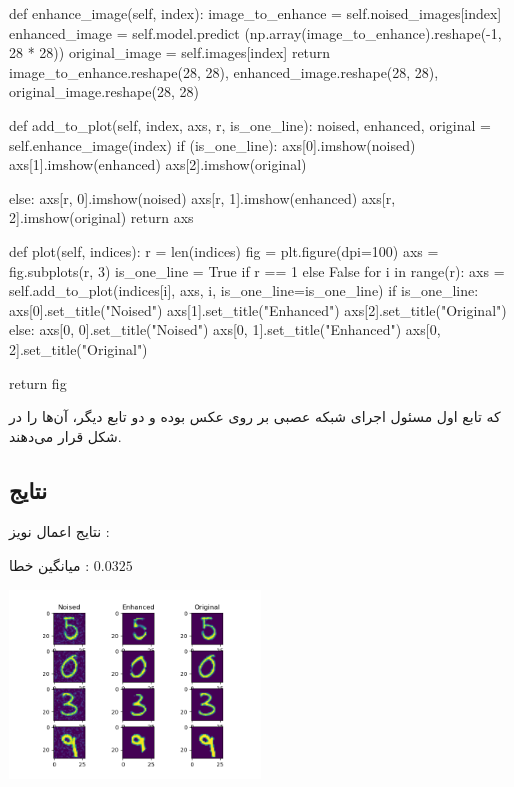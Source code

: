 \documentclass[12pt,titlepage,a4page , tikz , multi,table , svgnames,xcdraw]{article}
\begin{document}
  \begin{latin}
\begin{python}[language=Python]
 def enhance_image(self, index):
        image_to_enhance = self.noised_images[index]
        enhanced_image = self.model.predict
        (np.array(image_to_enhance).reshape(-1, 28 * 28))
        original_image = self.images[index]
        return image_to_enhance.reshape(28, 28),
         enhanced_image.reshape(28, 28),
          original_image.reshape(28, 28)

    def add_to_plot(self, index, axs, r, is_one_line):
        noised, enhanced, original = self.enhance_image(index)
        if (is_one_line):
            axs[0].imshow(noised)
            axs[1].imshow(enhanced)
            axs[2].imshow(original)

        else:
            axs[r, 0].imshow(noised)
            axs[r, 1].imshow(enhanced)
            axs[r, 2].imshow(original)
        return axs

    def plot(self, indices):
        r = len(indices)
        fig = plt.figure(dpi=100)
        axs = fig.subplots(r, 3)
        is_one_line = True if r == 1 else False
        for i in range(r):
            axs = self.add_to_plot(indices[i], axs, i, 
            is_one_line=is_one_line)
        if is_one_line:
            axs[0].set_title("Noised")
            axs[1].set_title("Enhanced")
            axs[2].set_title("Original")
        else:
            axs[0, 0].set_title("Noised")
            axs[0, 1].set_title("Enhanced")
            axs[0, 2].set_title("Original")

        return fig

\end{python}

\end{latin}

که تابع اول مسئول اجرای شبکه عصبی بر روی عکس بوده و دو تابع دیگر، آن‌ها را در شکل قرار می‌دهند.







\newpage
\subsection{نتایج}

نتایج اعمال نویز :

میانگین خطا : $
0.0325$

\begin{center}

 \includegraphics[width=0.5\textwidth]{pictures/20.png}

\end{center}
\end{document}
